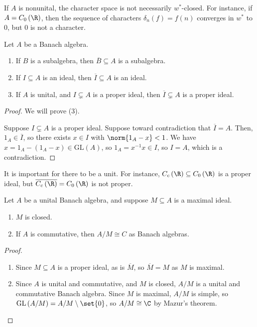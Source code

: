 \documentclass[10pt]{mypackage}
\newcommand{\GL}{\text{GL}}
\begin{document}
\begin{remark}
  If $A$ is nonunital, the character space is not necessarily $w^{\ast}$-closed. For instance, if $A = C_0\left(\R\right)$, then the sequence of characters $\delta_n\left(f\right) = f\left(n\right)$ converges in $w^{\ast}$ to $0$, but $0$ is not a character.
\end{remark}
\begin{proposition}
  Let $A$ be a Banach algebra.
  \begin{enumerate}[(1)]
    \item If $B$ is a subalgebra, then $\overline{B}\subseteq A$ is a subalgebra.
    \item If $I\subseteq A$ is an ideal, then $\overline{I}\subseteq A$ is an ideal.
    \item If $A$ is unital, and $I\subsetneq A$ is a proper ideal, then $\overline{I}\subsetneq A$ is a proper ideal.
  \end{enumerate}
\end{proposition}
\begin{proof}
  We will prove (3).\newline

  Suppose $I\subsetneq A$ is a proper ideal. Suppose toward contradiction that $\overline{I} = A$. Then, $1_A\in \overline{I}$, so there exists $x\in I$ with $\norm{1_A - x} < 1$. We have $x = 1_A - \left(1_A - x\right)\in \GL\left(A\right)$, so $1_A = x^{-1}x \in I$, so $I = A$, which is a contradiction.
\end{proof}
\begin{remark}
  It is important for there to be a unit. For instance, $C_c\left(\R\right)\subseteq C_0\left(\R\right)$ is a proper ideal, but $\overline{C_c\left(\R\right)} = C_0\left(\R\right)$ is not proper.
\end{remark}
\begin{corollary}
  Let $A$ be a unital Banach algebra, and suppose $M\subseteq A$ is a maximal ideal.
  \begin{enumerate}[(1)]
    \item $M$ is closed.
    \item If $A$ is commutative, then $A/M\cong C$ as Banach algebras.
  \end{enumerate}
\end{corollary}
\begin{proof}\hfill
  \begin{enumerate}[(1)]
    \item Since $M\subseteq A$ is a proper ideal, as is $\overline{M}$, so $\overline{M} = M$ as $M$ is maximal.
    \item Since $A$ is unital and commutative, and $M$ is closed, $A/M$ is a unital and commutative Banach algebra. Since $M$ is maximal, $A/M$ is simple, so $\GL\left(A/M\right) = A/M\setminus \set{0}$, so $A/M\cong \C$ by Mazur's theorem.
  \end{enumerate}
\end{proof}
\end{document}
